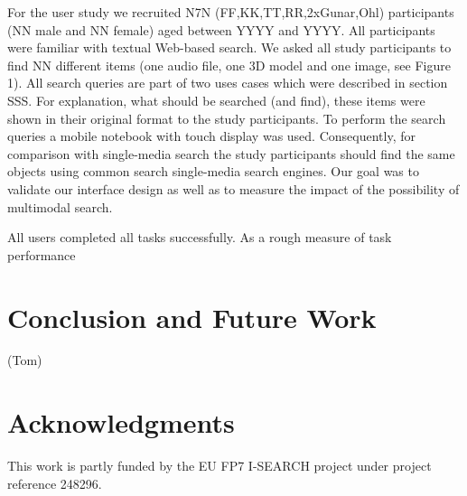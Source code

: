 \documentclass[runningheads,a4paper]{llncs} \usepackage[utf8]{inputenc}
\begin{document}
For the user study we recruited N7N (FF,KK,TT,RR,2xGunar,Ohl) participants (NN male and NN female) aged between YYYY and YYYY. All participants were familiar with textual Web-based search. We asked all study participants to find NN different items (one audio file, one 3D model and one image, see Figure 1). All search queries are part of two uses cases which were described in section SSS. For explanation, what should be searched (and find), these items were shown in their original format to the study participants. To perform the search queries a mobile notebook with touch display was used. Consequently, for comparison with single-media search the study participants should find the same objects using common search single-media search engines. Our goal was to validate our interface design as well as to measure the impact of the possibility of multimodal search. 

All users completed all tasks successfully. As a rough measure of task performance

\section{Conclusion and Future Work}
(Tom)

\section{Acknowledgments}
This work is partly funded by the EU FP7 \mbox{I-SEARCH} project under project reference 248296.



\end{document}

